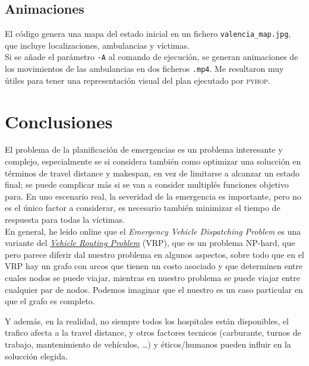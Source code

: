 \subsection{Animaciones}

El código genera una mapa del estado inicial en un fichero \texttt{valencia\_map.jpg}, que incluye localizaciones, ambulancias y víctimas.\\
Si se añade el parámetro \texttt{-A} al comando de ejecución, se generan animaciones de los movimientos de las ambulancias en dos ficheros \texttt{.mp4}.
Me resultaron muy útiles para tener una representación visual del plan ejecutado por \textsc{pyhop}.


\section{Conclusiones}

El problema de la planificación de emergencias es un problema interesante y complejo, especialmente se si considera también como optimizar una solucción en términos de travel distance y makespan, en vez de limitarse a alcanzar un estado final; se puede complicar más si se van a consider multiplés funciones objetivo para.
En uno escenario real, la severidad de la emergencia es importante, pero no es el único factor a considerar, es necesario también minimizar el tiempo de respuesta para todas la víctimas.\\
En general, he leido online que el \textit{Emergency Vehicle Dispatching Problem} es una variante del \href{https://en.wikipedia.org/wiki/Vehicle_routing_problem}{\textit{Vehicle Routing Problem}} (VRP), que es un problema NP-hard, que pero parece diferir dal nuestro problema en algunos aspectos, sobre todo que en el VRP hay un grafo con arcos que tienen un costo asociado y que determinen entre cuales nodos se puede viajar, mientras en nuestro problema se puede viajar entre cualquier par de nodos. Podemos imaginar que el nuestro es un caso particular en que el grafo es completo.

Y además, en la realidad, no siempre todos los hospitales están disponibles, el trafico afecta a la travel distance, y otros factores tecnicos (carburante, turnos de trabajo, mantenimiento de vehículos, \dots) y éticos/humanos pueden influir en la solucción elegida.

